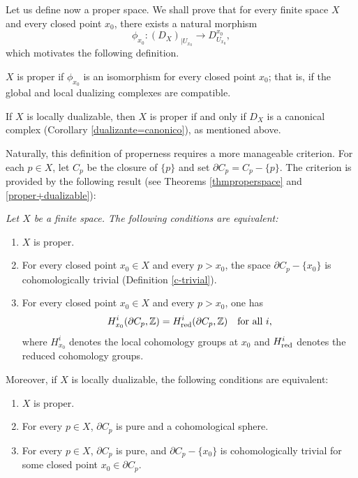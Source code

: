 \documentclass[amssymb,amscd,11pt,20pt]{amsart}
\newcommand{\ZZ}{{\mathbb Z}}
\newcommand{\0}{\mathbf 0}
\theoremstyle{plain}
\numberwithin{equation}{thm}
\begin{document}
Let us define now a proper space. We shall prove   that for every finite space $X$ and every closed point $x_0$, there exists a natural morphism
\[\phi_{x_0}\colon (D_X)_{\vert U_{x_0}}\to D_{U_{x_0}}^{x_0},\] which motivates the following definition.

\smallskip
{} $X$ is proper if $\phi_{x_0}$ is an isomorphism for every closed point $x_0$; that is, if the global and local dualizing complexes are compatible.
\smallskip

If $X$ is locally dualizable, then $X$ is proper if and only if $D_X$ is a canonical complex (Corollary \ref{dualizante=canonico}), as mentioned above.

Naturally, this definition of properness requires a more manageable criterion. For each $p\in X$, let $C_p$ be the closure of $\{p\}$ and set $\partial C_p=C_p- \{p\}$. The criterion is provided by the following result (see Theorems \ref{thmproperspace} and  \ref{proper+dualizable}):

\smallskip
{} {\it Let $X$ be a finite space. The following conditions are equivalent:
\begin{enumerate}\item $X$ is proper.
\item  For every closed point $x_0\in X$ and every $p>x_0 $, the space $\partial C_p-\{x_0\}$ is cohomologically trivial (Definition \ref{c-trivial}). 
\item For every closed point $x_0\in X$ and every $p>x_0 $, one has
\[ H^i_{x_0}(\partial C_p,\ZZ) = H^i_{\text{\rm red}}(\partial C_p,\ZZ)\quad \text{for all }i,\]
where $H^i_{x_0}$ denotes the local cohomology groups at $x_0$ and $H^i_{\text{\rm red}}$ denotes the reduced cohomology groups.
\end{enumerate}  



Moreover, if $X$ is locally dualizable, the following conditions are equivalent:

\begin{enumerate}
\item $X$ is proper.
\item For every $p\in X$,    $\partial C_p$ is pure and  a cohomological sphere.
\item For every $p\in X$, $\partial C_p $ is pure, and $\partial C_p-\{x_0\}$ is cohomologically trivial for some closed point $x_0\in\partial C_p$.
\end{enumerate}}
\smallskip
\end{document}

